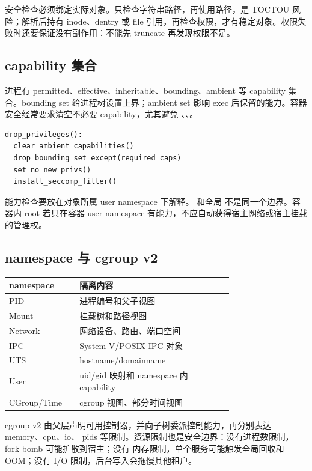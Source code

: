安全检查必须绑定实际对象。只检查字符串路径，再使用路径，是 TOCTOU 风险；解析后持有 inode、dentry 或 file 引用，再检查权限，才有稳定对象。权限失败时还要保证没有副作用：不能先 truncate 再发现权限不足。

\subsection{capability 集合}

进程有 permitted、effective、inheritable、bounding、ambient 等 capability 集合。bounding set 给进程树设置上界；ambient set 影响 exec 后保留的能力。容器安全经常要求清空不必要 capability，尤其避免 、、。

\begin{lstlisting}
drop_privileges():
  clear_ambient_capabilities()
  drop_bounding_set_except(required_caps)
  set_no_new_privs()
  install_seccomp_filter()
\end{lstlisting}

能力检查要放在对象所属 user namespace 下解释。 和全局  不是同一个边界。容器内 root 若只在容器 user namespace 有能力，不应自动获得宿主网络或宿主挂载的管理权。

\subsection{namespace 与 cgroup v2}

\begin{longtable}{p{0.18\linewidth}p{0.56\linewidth}}
\toprule
namespace & 隔离内容 \\
\midrule
PID & 进程编号和父子视图 \\
Mount & 挂载树和路径视图 \\
Network & 网络设备、路由、端口空间 \\
IPC & System V/POSIX IPC 对象 \\
UTS & hostname/domainname \\
User & uid/gid 映射和 namespace 内 capability \\
CGroup/Time & cgroup 视图、部分时间视图 \\
\bottomrule
\end{longtable}

cgroup v2 由父层声明可用控制器，并向子树委派控制能力，再分别表达 memory、cpu、io、
pids 等限制。资源限制也是安全边界：没有进程数限制，fork bomb 可能扩散到宿主；没有
内存限制，单个服务可能触发全局回收和 OOM；没有 I/O 限制，后台写入会拖慢其他租户。

